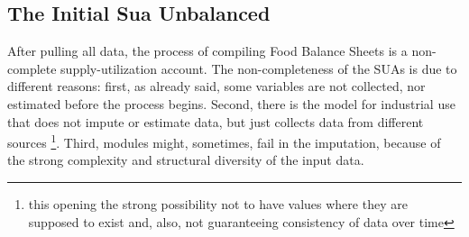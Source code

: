\documentclass[]{article}
\let\rmarkdownfootnote\footnote%
\def\footnote{\protect\rmarkdownfootnote}
\begin{document}
\subsection*{The Initial Sua
Unbalanced}\label{the-initial-sua-unbalanced}

After pulling all data, the process of compiling Food Balance Sheets is
a non-complete supply-utilization account. The non-completeness of the
SUAs is due to different reasons: first, as already said, some variables
are not collected, nor estimated before the process begins. Second,
there is the model for industrial use that does not impute or estimate
data, but just collects data from different sources \footnote{this
  opening the strong possibility not to have values where they are
  supposed to exist and, also, not guaranteeing consistency of data over
  time}. Third, modules might, sometimes, fail in the imputation,
because of the strong complexity and structural diversity of the input
data.
\end{document}
